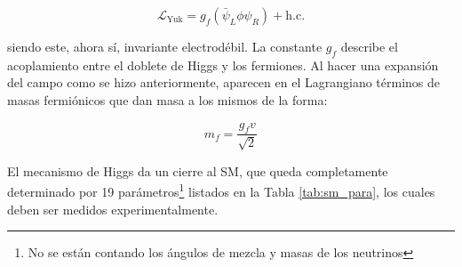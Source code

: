 \begin{equation}
	\mathcal{L}_{\text{Yuk}} = g_f(\bar{\psi}_L\phi \psi_R) + \text{h.c.}
\end{equation}

\noindent
siendo este, ahora sí, invariante electrodébil. 
La constante $g_f$ describe el acoplamiento entre el doblete de Higgs y los fermiones. Al hacer una expansión del campo como se hizo anteriormente, aparecen en el Lagrangiano términos de masas fermiónicos que dan masa a los mismos de la forma:

\begin{equation}
m_f = \frac{g_f v}{\sqrt{2}}
\end{equation}

El mecanismo de Higgs da un cierre al SM, que queda completamente determinado por 19 parámetros\footnote{No se están contando los ángulos de mezcla y masas de los neutrinos} listados en la Tabla \ref{tab:sm_para}, los cuales deben ser medidos experimentalmente.

\vspace{1.5cm}

